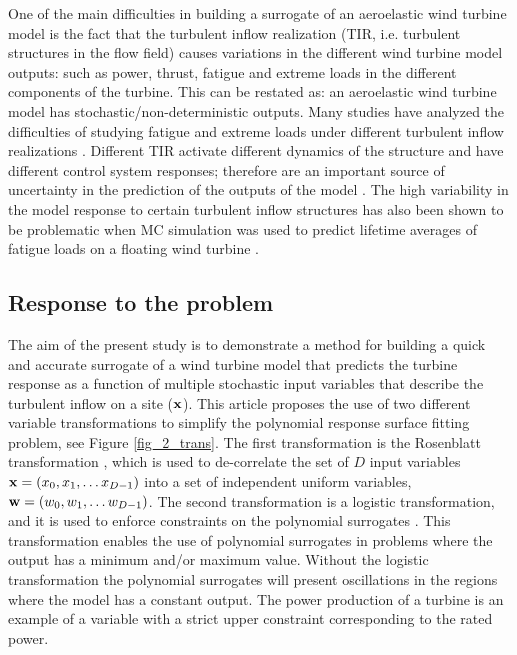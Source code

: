 \documentclass[preprint,12pt]{elsarticle}
\begin{document}
One of the main difficulties in building a surrogate of an aeroelastic wind turbine model is the fact that the turbulent inflow realization (TIR, i.e. turbulent structures in the flow field) causes variations in the different wind turbine model outputs: such as power, thrust, fatigue and extreme loads in the different components of the turbine. This can be restated as: an aeroelastic wind turbine model has stochastic/non-deterministic outputs. Many studies have analyzed the difficulties of studying fatigue and extreme loads under different turbulent inflow realizations \cite{moriarty2008database, natarajan2012outlier, tibaldi2014investigation, abdallah2016influence, toft2016assessment}. Different TIR activate different dynamics of the structure and have different control system responses; therefore are an important source of uncertainty in the prediction of the outputs of the model \cite{moriarty2008database}. The high variability in the model response to certain turbulent inflow structures has also been shown to be problematic when MC simulation was used to predict lifetime averages of fatigue loads on a floating wind turbine \cite{graf2015high}.


\subsection{Response to the problem}
The aim of the present study is to demonstrate a method for building a quick and accurate surrogate of a wind turbine model that predicts the turbine response as a function of multiple stochastic input variables that describe the turbulent inflow on a site ($\mathbf{x}$). This article proposes the use of two different variable transformations to simplify the polynomial response surface fitting problem, see Figure \ref{fig_2_trans}. The first transformation is the Rosenblatt transformation \cite{rosenblatt1952}, which is used to de-correlate the set of $D$ input variables $\mathbf{x} = (x_0, x_1, \ldots x_{D-1})$ into a set of independent uniform variables, $\mathbf{w} = (w_0, w_1, \ldots w_{D-1})$. The second transformation is a logistic transformation, and it is used to enforce constraints on the polynomial surrogates \cite{simard1998transformation}. This transformation enables the use of polynomial surrogates in problems where the output has a minimum and/or maximum value. Without the logistic transformation the polynomial surrogates will present oscillations in the regions where the model has a constant output. The power production of a turbine is an example of a variable with a strict upper constraint corresponding to the rated power.
\end{document}
